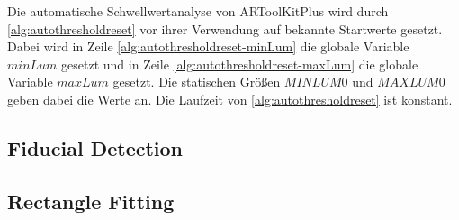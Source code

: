 Die automatische Schwellwertanalyse von ARToolKitPlus wird durch \autoref{alg:autothresholdreset} vor ihrer Verwendung
 auf bekannte Startwerte gesetzt. Dabei wird in Zeile \ref{alg:autothresholdreset-minLum} die globale Variable
 $\mathit{minLum}$ gesetzt und in Zeile \ref{alg:autothresholdreset-maxLum} die globale Variable $\mathit{maxLum}$
 gesetzt. Die statischen Größen $\mathit{MINLUM0}$ und $\mathit{MAXLUM0}$ geben dabei die Werte an. Die Laufzeit von
 \autoref{alg:autothresholdreset} ist konstant.







\subsection{Fiducial Detection} %
\label{sec:fiducial_detection}


\subsection{Rectangle Fitting} %
\label{sec:rectangle_fitting}


